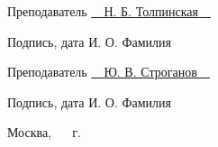 \begin{titlepage}
	\vspace{0.5cm}
	
	\fontsize{12pt}{12pt}\selectfont
	\noindent\textnormal{Преподаватель} \hspace{52mm}
	\underline{\textnormal{\hphantom{~~~~~~~~~~~~~~~~~~~~~~~~~~~}}} \hspace{14mm}
	\noindent\underline{\textnormal{~~Н. Б. Толпинская~~}}
	
	\vspace{2mm}
	\noindent\textnormal{\hphantom{Студент}} \hspace{17mm}\noindent
	\fontsize{8pt}{8pt}
	\hphantom{Группа}\hspace{43mm}\textnormal{Подпись, дата} \hspace{30mm}\noindent\textnormal{И. О. Фамилия}
	
	\vspace{0.5cm}
	
	\fontsize{12pt}{12pt}\selectfont
	\noindent\textnormal{Преподаватель} \hspace{52mm}
	\underline{\textnormal{\hphantom{~~~~~~~~~~~~~~~~~~~~~~~~~~~}}} \hspace{14mm}
	\noindent\underline{\textnormal{~~Ю. В. Строганов~~}}
	
	\vspace{2mm}
	\noindent\textnormal{\hphantom{Студент}} \hspace{17mm}\noindent
	\fontsize{8pt}{8pt}
	\hphantom{Группа}\hspace{43mm}\textnormal{Подпись, дата} \hspace{30mm}\noindent\textnormal{И. О. Фамилия}
	
	\vspace{1cm}
	
	\fontsize{12pt}{12pt}\selectfont
	
	\begin{center}
		\vfill
		Москва, ~\the\year
		~г.
	\end{center}
	\restoregeometry

\end{titlepage}
